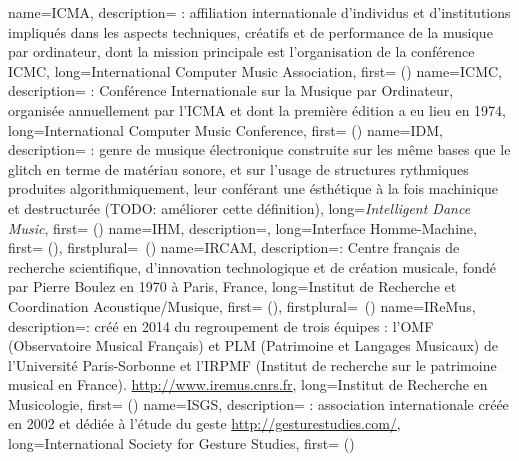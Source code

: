 {
    name={ICMA},
    description={\textit{} : affiliation internationale d'individus et d'institutions impliqués dans les aspects techniques, créatifs et de performance de la musique par ordinateur, dont la mission principale est l'organisation de la conférence \gls{ICMC}},
    long={International Computer Music Association},
    first={ ()}
}
{
    name={ICMC},
    description={\textit{} : Conférence Internationale sur la Musique par Ordinateur, organisée annuellement par l'\gls{ICMA} et dont la première édition a eu lieu en 1974},
    long={International Computer Music Conference},
    first={ ()}
}
{
    name={IDM},
    description={\textit{} : genre de musique électronique construite sur les même bases que le \gls{glitch} en terme de matériau sonore, et sur l'usage de structures rythmiques produites algorithmiquement, leur conférant une ésthétique à la fois machinique et destructurée (TODO: améliorer cette définition)},
    long={\textit{Intelligent Dance Music}},
    first={ ()}
}
{
    name={IHM},
    description={\textit{}},
    long={Interface Homme-Machine},
    first={ ()},
    firstplural={\glspluralsuffix\ (\glspluralsuffix)}
}
{
    name={IRCAM},
    description={\textit{}: Centre français de recherche scientifique, d'innovation technologique et de création musicale, fondé par Pierre Boulez en 1970 à Paris, France},
    long={Institut de Recherche et Coordination Acoustique/Musique},
    first={ ()},
    firstplural={\glspluralsuffix\ (\glspluralsuffix)}
}
{
    name={IReMus},
    description={\textit{}: créé en 2014 du regroupement de trois équipes : l'OMF (Observatoire Musical Français) et PLM (Patrimoine et Langages Musicaux) de l’Université Paris-Sorbonne et l’IRPMF (Institut de recherche sur le patrimoine musical en France). \url{http://www.iremus.cnrs.fr}},
    long={Institut de Recherche en Musicologie},
    first={ ()}
}
{
    name={ISGS},
    description={\textit{} : association internationale créée en 2002 et dédiée à l'étude du geste \url{http://gesturestudies.com/}},
    long={International Society for Gesture Studies},
    first={ ()}
}
